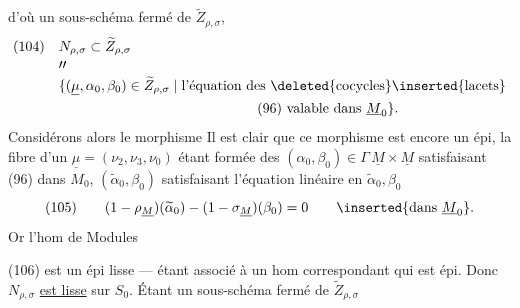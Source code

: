 d'où un sous-schéma fermé de $\widetilde Z_{\rho,\sigma}$,
\[
\begin{aligned}
(104)\quad&N_{\rho,\sigma}\subset\widetilde Z_{\rho,\sigma}\\[-2pt]
&\prime\prime\\[-2pt]
&\{(\underline\mu,\alpha_0,\beta_0)\in\widetilde Z_{\rho,\sigma}\mid
\text{l'équation des \deleted{cocycles}\inserted{lacets}}\\
&\hspace{5cm}\text{(96) valable dans }\underline M_0\}.
\end{aligned}
\]
Considérons alors le morphisme
Il est clair que ce morphisme est encore un épi, la fibre d'un
$\underline\mu=(\nu_2,\nu_3,\nu_0)$ étant formée des
$(\alpha_0,\beta_0)\in\Gamma\,\underline M\times\underline M$
satisfaisant (96) dans $M_0$,
$(\widetilde\alpha_0,\beta_0)$ satisfaisant l'équation linéaire
en $\widetilde\alpha_0,\beta_0$
\[
(105)\qquad
(1-\rho_{\underline M})(\widetilde\alpha_0)
-(1-\sigma_{\underline M})(\beta_0)=0
\qquad\inserted{\text{dans }\underline M_0}.
\]
Or l'hom de Modules

(106)
est un épi lisse --- étant associé à un hom
correspondant qui est  épi.
Donc  $N_{\rho,\sigma}$ \uline{est lisse} sur $S_0$.
 Étant un sous-schéma fermé de $\widetilde Z_{\rho,\sigma}$

